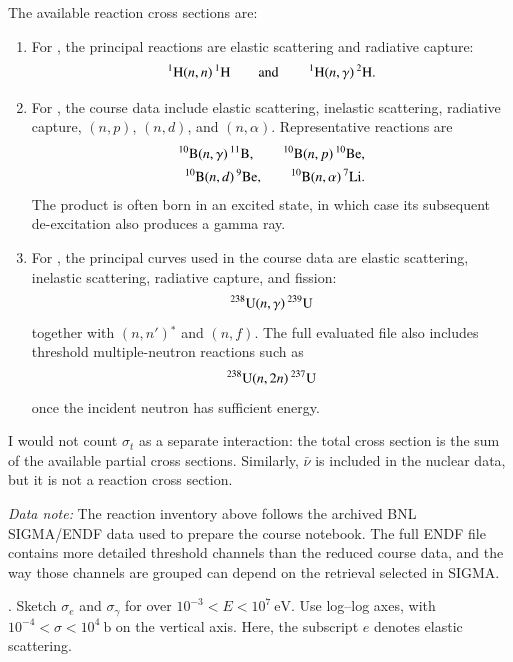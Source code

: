 \begin{draftsolution}
The available reaction cross sections are:

\begin{enumerate}[label=(\alph*)]
\item For , the principal reactions are elastic scattering and
radiative capture:
\[
 \isoA{H}{1}(n,n)\isoA{H}{1}
 \qquad\text{and}\qquad
 \isoA{H}{1}(n,\gamma)\isoA{H}{2}.
\]

\item For , the course data include elastic scattering, inelastic
scattering, radiative capture, $(n,p)$, $(n,d)$, and $(n,\alpha)$.
Representative reactions are
\[
\begin{split}
 \isoA{B}{10}(n,\gamma)\isoA{B}{11},\qquad
 \isoA{B}{10}(n,p)\isoA{Be}{10},\\
 \isoA{B}{10}(n,d)\isoA{Be}{9},\qquad
 \isoA{B}{10}(n,\alpha)\isoA{Li}{7}.
\end{split}
\]
The  product is often born in an excited state, in which case its
subsequent de-excitation also produces a gamma ray.

\item For , the principal curves used in the course data are
elastic scattering, inelastic scattering, radiative capture, and fission:
\[
 \isoA{U}{238}(n,\gamma)\isoA{U}{239}
\]
together with $(n,n')$$^*$ and
$(n,f)$.  The full evaluated file also includes threshold
multiple-neutron reactions such as
\[
 \isoA{U}{238}(n,2n)\isoA{U}{237}
\]
once the incident neutron has sufficient energy.
\end{enumerate}

I would not count $\sigma_t$ as a separate interaction: the total cross
section is the sum of the available partial cross sections.  Similarly,
$\bar{\nu}$ is included in the nuclear data, but it is not a reaction cross
section.

\medskip
\noindent\emph{Data note:} The reaction inventory above follows the archived
BNL SIGMA/ENDF data used to prepare the course notebook.  The full ENDF file
contains more detailed threshold channels than the reduced course data, and
the way those channels are grouped can depend on the retrieval selected in
SIGMA.
\end{draftsolution}

\newpage

.  Sketch $\sigma_e$ and $\sigma_\gamma$ for
 over $10^{-3}<E<10^7~\mathrm{eV}$.  Use log--log axes, with
$10^{-4}<\sigma<10^4~\mathrm{b}$ on the vertical axis.  Here, the subscript
$e$ denotes elastic scattering.

